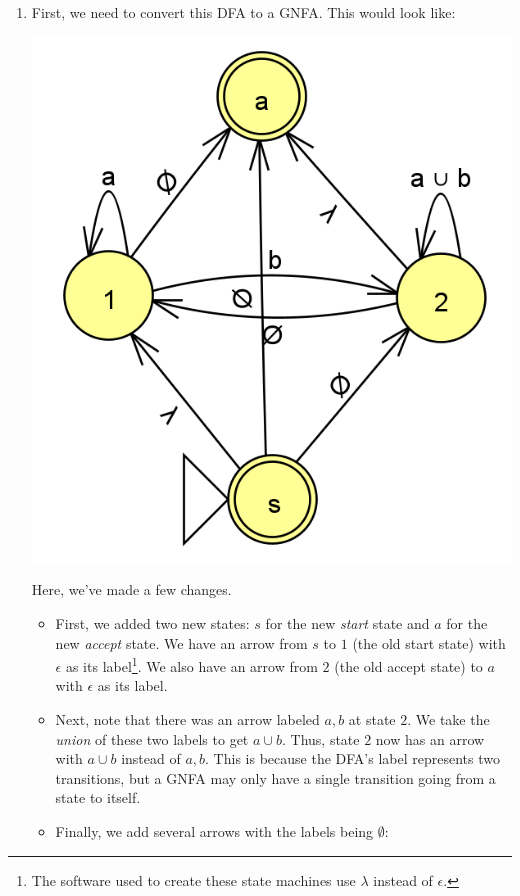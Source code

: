 \documentclass[letterpaper]{article}
\begin{document}
\begin{enumerate}
    \item First, we need to convert this DFA to a GNFA. This would look like: 
    \begin{center}
        \includegraphics[scale=0.4]{../assets/dfa_regex_2.png}
    \end{center}
    Here, we've made a few changes. 
    \begin{itemize}
        \item First, we added two new states: $s$ for the new \emph{start} state and $a$ for the new \emph{accept} state. We have an arrow from $s$ to $1$ (the old start state) with $\epsilon$ as its label\footnote{The software used to create these state machines use $\lambda$ instead of $\epsilon$.}. We also have an arrow from $2$ (the old accept state) to $a$ with $\epsilon$ as its label. 
        \item Next, note that there was an arrow labeled $a, b$ at state $2$. We take the \emph{union} of these two labels to get $a \cup b$. Thus, state $2$ now has an arrow with $a \cup b$ instead of $a, b$. This is because the DFA's label represents two transitions, but a GNFA may only have a single transition going from a state to itself. 
        \item Finally, we add several arrows with the labels being $\emptyset$:

\end{itemize}
\end{enumerate}
\end{document}

